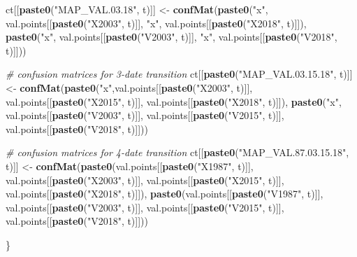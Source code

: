 \documentclass[a4paper, notitlepage, 12pt, krantz2]{krantz}
\newenvironment{Shaded}{\begin{snugshade}}{\end{snugshade}}
\newcommand{\CommentTok}[1]{\textcolor[rgb]{0.56,0.35,0.01}{\textit{#1}}}
\newcommand{\KeywordTok}[1]{\textcolor[rgb]{0.13,0.29,0.53}{\textbf{#1}}}
\newcommand{\NormalTok}[1]{#1}
\newcommand{\StringTok}[1]{\textcolor[rgb]{0.31,0.60,0.02}{#1}}
\begin{document}
\begin{Shaded}
\begin{Highlighting}[]
{{{{{{{{{\NormalTok{  ct[[}\KeywordTok{paste0}\NormalTok{(}\StringTok{"MAP_VAL.03.18"}\NormalTok{, t)]]       <-}\StringTok{ }\KeywordTok{confMat}\NormalTok{(}\KeywordTok{paste0}\NormalTok{(}\StringTok{"x"}\NormalTok{,         val.points[[}\KeywordTok{paste0}\NormalTok{(}\StringTok{"X2003"}\NormalTok{, t)]], }\StringTok{"x"}\NormalTok{,         val.points[[}\KeywordTok{paste0}\NormalTok{(}\StringTok{"X2018"}\NormalTok{, t)]]), }\KeywordTok{paste0}\NormalTok{(}\StringTok{"x"}\NormalTok{,         val.points[[}\KeywordTok{paste0}\NormalTok{(}\StringTok{"V2003"}\NormalTok{, t)]], }\StringTok{"x"}\NormalTok{,         val.points[[}\KeywordTok{paste0}\NormalTok{(}\StringTok{"V2018"}\NormalTok{, t)]]))}
  
  \CommentTok{# confusion matrices for 3-date transition}
\NormalTok{  ct[[}\KeywordTok{paste0}\NormalTok{(}\StringTok{"MAP_VAL.03.15.18"}\NormalTok{, t)]]    <-}\StringTok{ }\KeywordTok{confMat}\NormalTok{(}\KeywordTok{paste0}\NormalTok{(}\StringTok{"x"}\NormalTok{,val.points[[}\KeywordTok{paste0}\NormalTok{(}\StringTok{"X2003"}\NormalTok{, t)]], val.points[[}\KeywordTok{paste0}\NormalTok{(}\StringTok{"X2015"}\NormalTok{, t)]], val.points[[}\KeywordTok{paste0}\NormalTok{(}\StringTok{"X2018"}\NormalTok{, t)]]), }\KeywordTok{paste0}\NormalTok{(}\StringTok{"x"}\NormalTok{, val.points[[}\KeywordTok{paste0}\NormalTok{(}\StringTok{"V2003"}\NormalTok{, t)]], val.points[[}\KeywordTok{paste0}\NormalTok{(}\StringTok{"V2015"}\NormalTok{, t)]], val.points[[}\KeywordTok{paste0}\NormalTok{(}\StringTok{"V2018"}\NormalTok{, t)]]))}
  
  \CommentTok{# confusion matrices for 4-date transition}
\NormalTok{  ct[[}\KeywordTok{paste0}\NormalTok{(}\StringTok{"MAP_VAL.87.03.15.18"}\NormalTok{, t)]] <-}\StringTok{ }\KeywordTok{confMat}\NormalTok{(}\KeywordTok{paste0}\NormalTok{(val.points[[}\KeywordTok{paste0}\NormalTok{(}\StringTok{"X1987"}\NormalTok{, t)]], val.points[[}\KeywordTok{paste0}\NormalTok{(}\StringTok{"X2003"}\NormalTok{, t)]], val.points[[}\KeywordTok{paste0}\NormalTok{(}\StringTok{"X2015"}\NormalTok{, t)]], val.points[[}\KeywordTok{paste0}\NormalTok{(}\StringTok{"X2018"}\NormalTok{, t)]]), }\KeywordTok{paste0}\NormalTok{(val.points[[}\KeywordTok{paste0}\NormalTok{(}\StringTok{"V1987"}\NormalTok{, t)]], val.points[[}\KeywordTok{paste0}\NormalTok{(}\StringTok{"V2003"}\NormalTok{, t)]], val.points[[}\KeywordTok{paste0}\NormalTok{(}\StringTok{"V2015"}\NormalTok{, t)]], val.points[[}\KeywordTok{paste0}\NormalTok{(}\StringTok{"V2018"}\NormalTok{, t)]]))}
  
\NormalTok{\}}

}}}}}}}}}
\end{Highlighting}
\end{Shaded}
\end{document}
